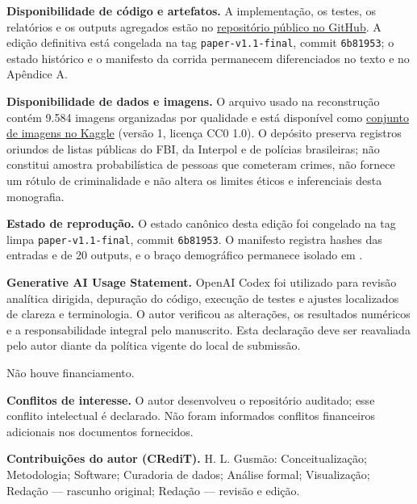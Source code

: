 \begin{declarations}

\textbf{Disponibilidade de código e artefatos.} A implementação, os testes, os relatórios e os outputs agregados estão no \uline{repositório público no GitHub}. A edição definitiva está congelada na tag \texttt{paper-v1.1-final}, commit \texttt{6b81953}; o estado histórico e o manifesto da corrida permanecem diferenciados no texto e no Apêndice A.

\textbf{Disponibilidade de dados e imagens.} O arquivo usado na reconstrução contém 9.584 imagens organizadas por qualidade e está disponível como \uline{conjunto de imagens no Kaggle} (versão 1, licença CC0 1.0). O depósito preserva registros oriundos de listas públicas do FBI, da Interpol e de polícias brasileiras; não constitui amostra probabilística de pessoas que cometeram crimes, não fornece um rótulo de criminalidade e não altera os limites éticos e inferenciais desta monografia.

\textbf{Estado de reprodução.} O estado canônico desta edição foi congelado na tag limpa \texttt{paper-v1.1-final}, commit \texttt{6b81953}. O manifesto registra hashes das entradas e de 20 outputs, e o braço demográfico permanece isolado em .

\textbf{Generative AI Usage Statement.} OpenAI Codex foi utilizado para revisão analítica dirigida, depuração do código, execução de testes e ajustes localizados de clareza e terminologia. O autor verificou as alterações, os resultados numéricos e a responsabilidade integral pelo manuscrito. Esta declaração deve ser reavaliada pelo autor diante da política vigente do local de submissão.

Não houve financiamento.

\textbf{Conflitos de interesse.} O autor desenvolveu o repositório auditado; esse conflito intelectual é declarado. Não foram informados conflitos financeiros adicionais nos documentos fornecidos.

\textbf{Contribuições do autor (CRediT).} H. L. Gusmão: Conceitualização; Metodologia; Software; Curadoria de dados; Análise formal; Visualização; Redação --- rascunho original; Redação --- revisão e edição.


\end{declarations}
